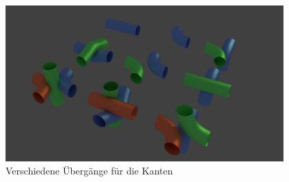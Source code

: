 	\begin{figure}[ht]
	  \centering
	  \includegraphics[width = 0.95\textwidth]{Inhalt/Nutzung/Grafiken/Grafische_Oberflaechen/Pipes2.png}
	  \caption{Verschiedene Übergänge für die Kanten}
	  \label{fig:pipes2}
	\end{figure}
	
	

